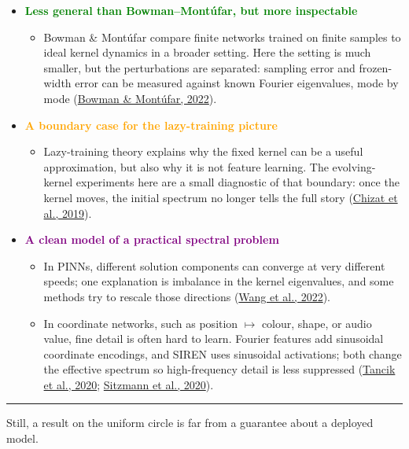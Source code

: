 \documentclass[aspectratio=169,9pt]{beamer}
\begin{document}
\begin{frame}
{\begin{itemize}
			      \pause
			\item {\bfseries\textcolor{green}{Less general than Bowman--Montúfar, but more inspectable}}
			      \begin{itemize}\tightlist\scriptsize
				      \item Bowman \& Montúfar compare finite networks trained on finite samples to ideal kernel dynamics in a broader setting. Here the setting is much smaller, but the perturbations are separated: sampling error and frozen-width error can be measured against known Fourier eigenvalues, mode by mode
				            (\textcolor{muted}{\href{https://arxiv.org/abs/2206.02927}{Bowman \& Mont\'ufar, 2022}}).
			      \end{itemize}

			      \pause
			\item {\bfseries\textcolor{orange}{A boundary case for the lazy-training picture}}
			      \begin{itemize}\tightlist\scriptsize
				      \item Lazy-training theory explains why the fixed kernel can be a useful approximation, but also why it is not feature learning. The evolving-kernel experiments here are a small diagnostic of that boundary: once the kernel moves, the initial spectrum no longer tells the full story
				            (\textcolor{muted}{\href{https://arxiv.org/abs/1812.07956}{Chizat et al., 2019}}).
			      \end{itemize}

			      \pause
			\item {\bfseries\textcolor{purple}{A clean model of a practical spectral problem}}
			      \begin{itemize}\tightlist\scriptsize
				      \item In PINNs, different solution components can converge at very different speeds; one explanation is imbalance in the kernel eigenvalues, and some methods try to rescale those directions
				            (\textcolor{muted}{\href{https://arxiv.org/abs/2007.14527}{Wang et al., 2022}}).
				      \item In coordinate networks, such as position \(\mapsto\) colour, shape, or audio value, fine detail is often hard to learn. Fourier features add sinusoidal coordinate encodings, and SIREN uses sinusoidal activations; both change the effective spectrum so high-frequency detail is less suppressed
				            (\textcolor{muted}{\href{https://arxiv.org/abs/2006.10739}{Tancik et al., 2020}};
				            \textcolor{muted}{\href{https://arxiv.org/abs/2006.09661}{Sitzmann et al., 2020}}).
			      \end{itemize}
		\end{itemize}
	}

	\vspace{1mm}
	{\color{line}\rule{\linewidth}{0.35pt}}

	\vspace{1mm}
	\centering
	\pause
	{\scriptsize\textcolor{muted}{Still, a result on the uniform circle is far from a guarantee about a deployed model.}}
\end{frame}
\end{document}
